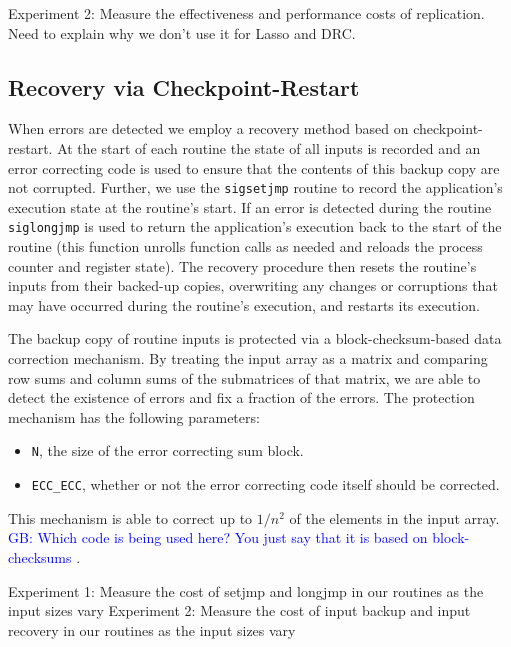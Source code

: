 \documentclass{sig-alternate}
\newcommand{\greg}[1]{%
  \textcolor{blue}{GB: #1}
}
\begin{document}
Experiment 2: Measure the effectiveness and performance costs of replication. Need to explain why we don't use it for Lasso and DRC.

\subsection{Recovery via Checkpoint-Restart}
\label{sec:res_tech:cr}

When errors are detected we employ a recovery method based on checkpoint-restart.
At the start of each routine the state of all inputs is recorded and an error correcting code is used to ensure that the contents of this backup copy are not corrupted.
Further, we use the \texttt{sigsetjmp} routine to record the application's execution state at the routine's start.
If an error is detected during the routine \texttt{siglongjmp} is used to return the application's execution back to the start of the routine (this function unrolls function calls as needed and reloads the process counter and register state).
The recovery procedure then resets the routine's inputs from their backed-up copies, overwriting any changes or corruptions that may have occurred during the routine's execution, and restarts its execution.

The backup copy of routine inputs is protected via a block-checksum-based data correction mechanism.
By treating the input array as a matrix and comparing row sums and column sums of the submatrices of that matrix, we are able to detect the existence of errors and fix a fraction of the errors.
The protection mechanism has the following parameters:
\begin{itemize}
\item{\texttt{N}, the size of the error correcting sum block.}
\item{\texttt{ECC\_ECC}, whether or not the error correcting code itself should be corrected.}
\end{itemize}
This mechanism is able to correct up to $1/{n^2}$ of the elements in the input array.
\greg{Which code is being used here? You just say that it is based on block-checksums}.

Experiment 1: Measure the cost of setjmp and longjmp in our routines as the input sizes vary
Experiment 2: Measure the cost of input backup and input recovery in our routines as the input sizes vary
\end{document}
